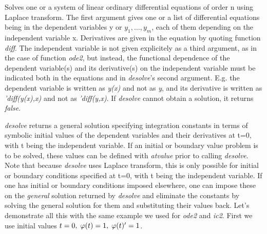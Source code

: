 \documentclass[../Maxima_Workbook.tex]{subfiles}
\begin{document}
\lz Solves one or a system of linear ordinary differential equations of order n using Laplace transform. The first argument gives one or a list of differential equations being in the dependent variables y or $ y_1,\dots,y_m $, each of them depending on the independent variable x. Derivatives are given in the equation by quoting function \emph{diff}. The independent variable is not given explicitely as a third argument, as in the case of function \emph{ode2}, but instead, the functional dependence of the dependent variable(s) and its derivative(s) on the independent variable must be indicated both in the equations and in \emph{desolve}'s second argument. E.g. the dependent variable is written as \emph{y(x)} and not as \emph{y}, and its derivative is written as \emph{'diff(y(x),x)} and not as \emph{'diff(y,x)}. If \emph{desolve} cannot obtain a solution, it returns \emph{false}.


\lz \emph{desolve} returns a general solution specifying integration constants in terms of symbolic initial values of the dependent variables and their derivatives at t=0, with t being the independent variable. If an initial or boundary value problem is to be solved, these values can be defined with \emph{atvalue} prior to calling \emph{desolve}. Note that because \emph{desolve} uses Laplace transform, this is only possible for initial or boundary conditions specified at t=0, with t being the independent variable. If one has initial or boundary conditions imposed elsewhere, one can impose these on the \emph{general} solution returned by \emph{desolve} and eliminate the constants by solving the general solution for them and substituting their values back. Let's demonstrate all this with the same example we used for \emph{ode2} and \emph{ic2}. First we use initial values $ t=0, \; \varphi(t)=1, \; \varphi(t)'=1 $.
\end{document}
